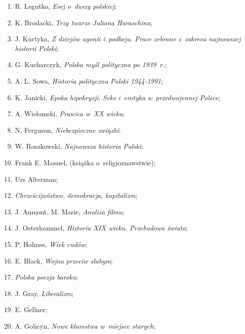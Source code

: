 \documentclass[a4paper,11pt]{article}
\begin{document}
\begin{enumerate}
\item R. Legutko, \emph{Esej o~duszy polskiej};

\item K. Brodacki, \emph{Trzy twarze Juliana Haraschina};

\item J. Kurtyka, \emph{Z dziejów agonii i~podboju. Prace zebrane
    z~zakresu najnowszej historii Polski};

\item G. Kucharczyk, \emph{Polska myśl polityczna po 1939~r.};

\item A. L. Sowa, \emph{Historia polityczna Polski 1944-1991};

\item K. Janicki, \emph{Epoka hipokryzji. Seks i~erotyka
    w~przedwojennej Polsce};

\item A. Wielomski, \emph{Prawica w~XX wieku};

\item N. Ferguson, \emph{Niebezpieczne związki};

\item W. Roszkowski, \emph{Najnowsza historia Polski};

\item Frank E. Manuel, (książka o~religioznawstwie);

\item Urs Alterman;

\item \emph{Chrześcijaństwo, demokracja, kapitalizm};

\item J. Aumont, M. Marie, \emph{Analiza filmu};

\item J. Osterhammel, \emph{Historia XIX wieku. Przebudowa świata};

\item P. Holmes, \emph{Wiek cudów};

\item E. Black, \emph{Wojna przeciw słabym};

\item \emph{Polska poezja baroku};

\item J. Gray, \emph{Liberalizm};

\item E. Gellner;

\item A. Golicyn, \emph{Nowe kłamstwa w~miejsce starych};


\end{enumerate}
\end{document}
